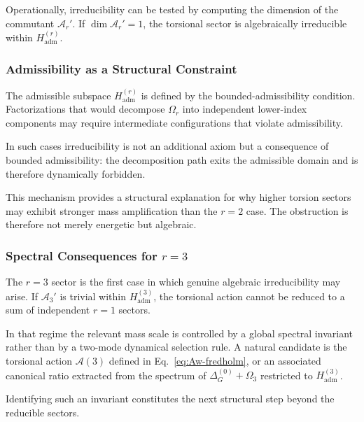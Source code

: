     Operationally, irreducibility can be tested by computing the
    dimension of the commutant $\mathcal{A}_r'$.
    If $\dim \mathcal{A}_r' = 1$, the torsional sector is algebraically
    irreducible within $H_{\mathrm{adm}}^{(r)}$.

  \subsubsection*{Admissibility as a Structural Constraint}

    The admissible subspace $H_{\mathrm{adm}}^{(r)}$ is defined by the
    bounded-admissibility condition.
    Factorizations that would decompose $\Omega_r$ into independent
    lower-index components may require intermediate configurations
    that violate admissibility.

    In such cases irreducibility is not an additional axiom but a
    consequence of bounded admissibility:
    the decomposition path exits the admissible domain and is therefore
    dynamically forbidden.

    This mechanism provides a structural explanation for why higher
    torsion sectors may exhibit stronger mass amplification than the
    $r=2$ case.
    The obstruction is therefore not merely energetic but algebraic.

  \subsubsection*{Spectral Consequences for $r=3$}

    The $r=3$ sector is the first case in which genuine algebraic
    irreducibility may arise.
    If $\mathcal{A}_3'$ is trivial within $H_{\mathrm{adm}}^{(3)}$,
    the torsional action cannot be reduced to a sum of independent
    $r=1$ sectors.

    In that regime the relevant mass scale is controlled by a global
    spectral invariant rather than by a two-mode dynamical selection rule.
    A natural candidate is the torsional action
    \(
    \mathcal{A}(3)
    \)
    defined in Eq.~\eqref{eq:Aw-fredholm}, or an associated canonical
    ratio extracted from the spectrum of
    \(
    \Delta^{(0)}_G+\Omega_3
    \)
    restricted to $H_{\mathrm{adm}}^{(3)}$.

    Identifying such an invariant constitutes the next structural step
    beyond the reducible sectors.
